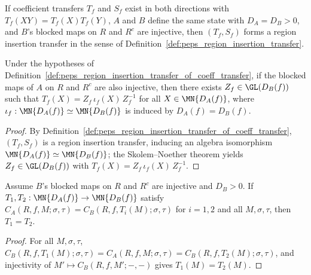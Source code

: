 \begin{definition}
    \label{def:peps_region_insertion_transfer_of_coeff_transfer}
    \leanok
    If coefficient transfers $T_f$ and $S_f$ exist in both directions with $T_f(XY)=T_f(X)T_f(Y)$, $A$ and $B$ define the same state with $D_A=D_B>0$, and $B$'s blocked maps on $R$ and $R^c$ are injective, then $(T_f,S_f)$ forms a region insertion transfer in the sense of Definition~\ref{def:peps_region_insertion_transfer}.
\end{definition}

\begin{lemma}
    \label{thm:peps_region_edge_gauge_of_coeff_transfer}
    \leanok
    Under the hypotheses of Definition~\ref{def:peps_region_insertion_transfer_of_coeff_transfer}, if the blocked maps of $A$ on $R$ and $R^c$ are also injective, then there exists $Z_f\in\GL(D_B(f))$ such that $T_f(X)=Z_f\,\iota_f(X)\,Z_f^{-1}$ for all $X\in\MN{D_A(f)}$, where $\iota_f:\MN{D_A(f)}\simeq\MN{D_B(f)}$ is induced by $D_A(f)=D_B(f)$.
\end{lemma}
\begin{proof}\leanok
    By Definition~\ref{def:peps_region_insertion_transfer_of_coeff_transfer}, $(T_f,S_f)$ is a region insertion transfer, inducing an algebra isomorphism $\MN{D_A(f)}\simeq\MN{D_B(f)}$; the Skolem--Noether theorem yields $Z_f\in\GL(D_B(f))$ with $T_f(X)=Z_f\,\iota_f(X)\,Z_f^{-1}$.
\end{proof}

\begin{lemma}
    \label{thm:peps_regionInsertedCoeff_transferMap_unique}
    \leanok
    Assume $B$'s blocked maps on $R$ and $R^c$ are injective and $D_B>0$. If $T_1,T_2:\MN{D_A(f)}\to\MN{D_B(f)}$ satisfy $C_A(R,f,M;\sigma,\tau)=C_B(R,f,T_i(M);\sigma,\tau)$ for $i=1,2$ and all $M,\sigma,\tau$, then $T_1=T_2$.
\end{lemma}
\begin{proof}\leanok
    For all $M,\sigma,\tau$, $C_B(R,f,T_1(M);\sigma,\tau)=C_A(R,f,M;\sigma,\tau)=C_B(R,f,T_2(M);\sigma,\tau)$, and injectivity of $M'\mapsto C_B(R,f,M';-,-)$ gives $T_1(M)=T_2(M)$.
\end{proof}

